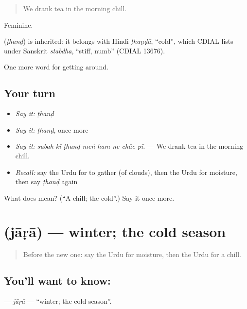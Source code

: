\begin{quote}
We drank tea in the morning chill.
\end{quote}

Feminine.

\begin{cousinweb}
\textbf{} (\emph{ṭhanḍ}) is inherited: it belongs with Hindi \emph{ṭhaṇḍā}, \textquotedblleft{}cold\textquotedblright{}, which CDIAL lists under Sanskrit \emph{stabdha}, \textquotedblleft{}stiff, numb\textquotedblright{} (CDIAL 13676).
\end{cousinweb}

\begin{grammarlens}[title={What you've built}]
One more word for getting around.
\end{grammarlens}

\subsection*{Your turn}
\begin{itemize}
\raggedright
  \item \emph{Say it:} \emph{ṭhanḍ}
  \item \emph{Say it:} \emph{ṭhanḍ}, once more
  \item \emph{Say it:} \emph{subah kī ṭhanḍ meṅ ham ne chāe pī.} — We drank tea in the morning chill.
  \item \emph{Recall:} say the Urdu for to gather (of clouds), then the Urdu for moisture, then say \emph{ṭhanḍ} again
\end{itemize}

\begin{tcolorbox}[breakable,colback=teal!4,colframe=teal!35!black,title={Before you move on}]
What does  mean? (\textquotedblleft{}A chill; the cold\textquotedblright{}.) Say it once more.
\end{tcolorbox}
\section[\texorpdfstring{\ur{جاڑا} (jāṛā)}{جاڑا (jāṛā)}]{ (jāṛā) — winter; the cold season}

\label{lesson:UR-C429-jara}



\begin{quote}
Before the new one: say the Urdu for moisture, then the Urdu for a chill.
\end{quote}

\subsection*{You'll want to know: }
\textbf{} — \emph{jāṛā} — \textquotedblleft{}winter; the cold season\textquotedblright{}.

